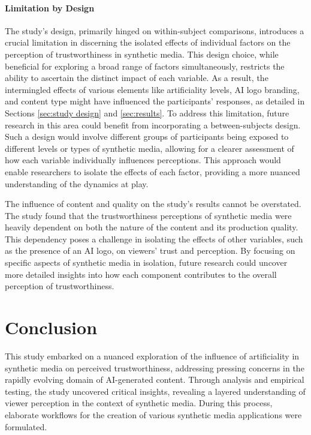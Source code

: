 \documentclass[
  a4paper,  %
  twoside,  %
  bibliography=totoc,
  headsepline,
  cleardoublepage=empty,
  parskip=half,
  draft=false
]{scrbook}
\begin{document}
\subsubsection{Limitation by Design}
The study's design, primarily hinged on within-subject comparisons, introduces a crucial limitation in discerning the isolated effects of individual factors on the perception of trustworthiness in synthetic media. This design choice, while beneficial for exploring a broad range of factors simultaneously, restricts the ability to ascertain the distinct impact of each variable. As a result, the intermingled effects of various elements like artificiality levels, AI logo branding, and content type might have influenced the participants' responses, as detailed in Sections \ref{sec:study design} and \ref{sec:results}. To address this limitation, future research in this area could benefit from incorporating a between-subjects design. Such a design would involve different groups of participants being exposed to different levels or types of synthetic media, allowing for a clearer assessment of how each variable individually influences perceptions. This approach would enable researchers to isolate the effects of each factor, providing a more nuanced understanding of the dynamics at play.

The influence of content and quality on the study's results cannot be overstated. The study found that the trustworthiness perceptions of synthetic media were heavily dependent on both the nature of the content and its production quality. This dependency poses a challenge in isolating the effects of other variables, such as the presence of an AI logo, on viewers' trust and perception. By focusing on specific aspects of synthetic media in isolation, future research could uncover more detailed insights into how each component contributes to the overall perception of trustworthiness.

\chapter{Conclusion}
\label{chap:conclusion}

This study embarked on a nuanced exploration of the influence of artificiality in synthetic media on perceived trustworthiness, addressing pressing concerns in the rapidly evolving domain of AI-generated content. Through analysis and empirical testing, the study uncovered critical insights, revealing a layered understanding of viewer perception in the context of synthetic media. During this process, elaborate workflows for the creation of various synthetic media applications were formulated.
\end{document}

